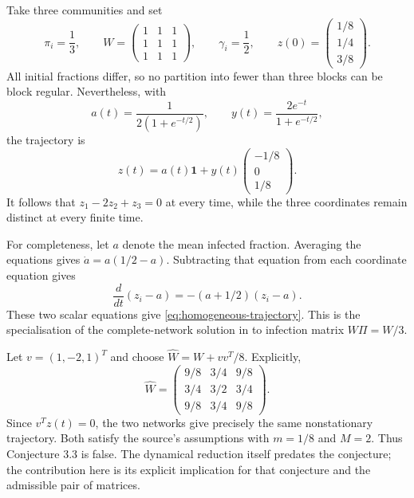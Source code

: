 Take three communities and set
\begin{equation}
 \pi_i=\frac13,\qquad
 W=\begin{pmatrix}1&1&1\\1&1&1\\1&1&1\end{pmatrix},\qquad
 \gamma_i=\frac12,\qquad
 z(0)=\begin{pmatrix}1/8\\1/4\\3/8\end{pmatrix}.
 \label{eq:homogeneous-example}
\end{equation}
All initial fractions differ, so no partition into fewer than three blocks can be block regular. Nevertheless, with
\[
 a(t)=\frac1{2(1+e^{-t/2})},\qquad
 y(t)=\frac{2e^{-t}}{1+e^{-t/2}},
\]
the trajectory is
\begin{equation}
 z(t)=a(t)\mathbf1+y(t)
 \begin{pmatrix}-1/8\\0\\1/8\end{pmatrix}.
 \label{eq:homogeneous-trajectory}
\end{equation}
It follows that $z_1-2z_2+z_3=0$ at every time, while the three coordinates remain distinct at every finite time.

For completeness, let $a$ denote the mean infected fraction. Averaging the equations gives $\dot a=a(1/2-a)$. Subtracting that equation from each coordinate equation gives
\[
 \frac d{dt}(z_i-a)=-(a+1/2)(z_i-a).
\]
These two scalar equations give \eqref{eq:homogeneous-trajectory}. This is the specialisation of the complete-network solution in \cite[Theorem 4]{PDM2021} to infection matrix $W\Pi=W/3$.

Let $v=(1,-2,1)^T$ and choose $\widehat W=W+vv^T/8$. Explicitly,
\begin{equation}
 \widehat W=
 \begin{pmatrix}
 9/8&3/4&9/8\\
 3/4&3/2&3/4\\
 9/8&3/4&9/8
 \end{pmatrix}.
 \label{eq:homogeneous-second-network}
\end{equation}
Since $v^Tz(t)=0$, the two networks give precisely the same nonstationary trajectory. Both satisfy the source's assumptions with $m=1/8$ and $M=2$. Thus Conjecture 3.3 is false. The dynamical reduction itself predates the conjecture; the contribution here is its explicit implication for that conjecture and the admissible pair of matrices.

